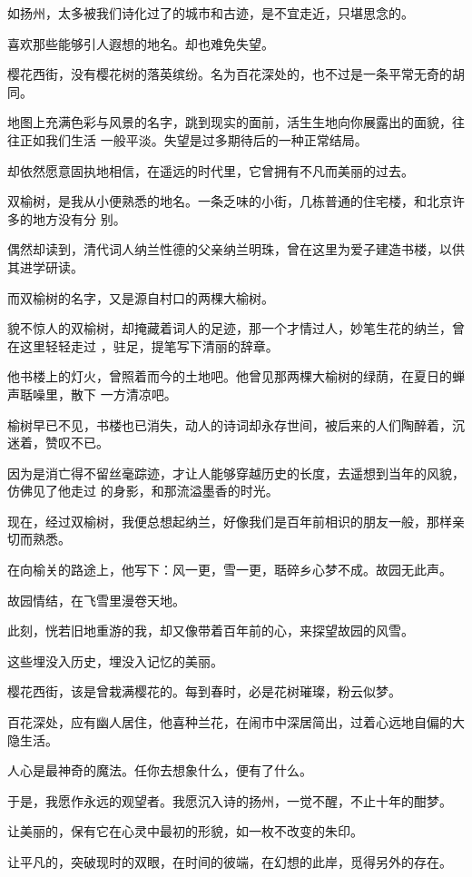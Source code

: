 \documentclass[12pt,a4paper]{article}
\begin{document}
		如扬州，太多被我们诗化过了的城市和古迹，是不宜走近，只堪思念的。

		喜欢那些能够引人遐想的地名。却也难免失望。\par
		樱花西街，没有樱花树的落英缤纷。名为百花深处的，也不过是一条平常无奇的胡同。

		地图上充满色彩与风景的名字，跳到现实的面前，活生生地向你展露出的面貌，往往正如我们生活
	一般平淡。失望是过多期待后的一种正常结局。

		却依然愿意固执地相信，在遥远的时代里，它曾拥有不凡而美丽的过去。

		双榆树，是我从小便熟悉的地名。一条乏味的小街，几栋普通的住宅楼，和北京许多的地方没有分
	别。

		偶然却读到，清代词人纳兰性德的父亲纳兰明珠，曾在这里为爱子建造书楼，以供其进学研读。\par
		而双榆树的名字，又是源自村口的两棵大榆树。

		貌不惊人的双榆树，却掩藏着词人的足迹，那一个才情过人，妙笔生花的纳兰，曾在这里轻轻走过
	，驻足，提笔写下清丽的辞章。

		他书楼上的灯火，曾照着而今的土地吧。他曾见那两棵大榆树的绿荫，在夏日的蝉声聒噪里，散下
	一方清凉吧。

		榆树早已不见，书楼也已消失，动人的诗词却永存世间，被后来的人们陶醉着，沉迷着，赞叹不已。

		因为是消亡得不留丝毫踪迹，才让人能够穿越历史的长度，去遥想到当年的风貌，仿佛见了他走过
	的身影，和那流溢墨香的时光。

		现在，经过双榆树，我便总想起纳兰，好像我们是百年前相识的朋友一般，那样亲切而熟悉。\par
		在向榆关的路途上，他写下：风一更，雪一更，聒碎乡心梦不成。故园无此声。\par
		故园情结，在飞雪里漫卷天地。\par
		此刻，恍若旧地重游的我，却又像带着百年前的心，来探望故园的风雪。

		这些埋没入历史，埋没入记忆的美丽。

		樱花西街，该是曾栽满樱花的。每到春时，必是花树璀璨，粉云似梦。\par
		百花深处，应有幽人居住，他喜种兰花，在闹市中深居简出，过着心远地自偏的大隐生活。\par
		人心是最神奇的魔法。任你去想象什么，便有了什么。

		于是，我愿作永远的观望者。我愿沉入诗的扬州，一觉不醒，不止十年的酣梦。\par
		让美丽的，保有它在心灵中最初的形貌，如一枚不改变的朱印。\par
		让平凡的，突破现时的双眼，在时间的彼端，在幻想的此岸，觅得另外的存在。
\end{document}
